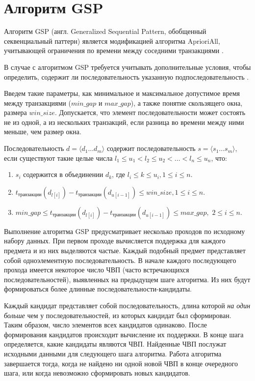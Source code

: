 \section{Алгоритм GSP}
Алгоритм GSP (англ. Generalized Sequential Pattern, обобщенный секвенциальный паттерн) является модификацией алгоритма AprioriAll, учитывающей ограничения по времени между соседними транзакциями \cite{1_, 32_}.

В случае с алгоритмом GSP требуется учитывать дополнительные условия, чтобы определить, содержит ли последовательность указанную подпоследовательность \cite{gsp}.

Введем такие параметры, как минимальное и максимальное допустимое время между транзакциями ($min\_gap$ и $max\_gap$), а также понятие скользящего окна, размера $win\_size$. Допускается, что элемент последовательности может состоять не из одной, а из нескольких транзакций, если разница во времени между ними меньше, чем размер окна.

Последовательность $d = \langle d_1...d_m \rangle$ содержит последовательность
$s = \langle s_1...s_m \rangle$, если существуют такие целые числа $l_1 ≤ u_1 < l_2 ≤ u_2 < ... < l_n ≤ u_n$, что:

\begin{enumerate}
	\item $s_i$ содержится в объединении $d_k$, где $l_i ≤ k ≤ u_i, 1 ≤ i ≤ n$.
	\item $t_{\text{транзакции}}(d_{l[i]}) - t_{\text{транзакции}} (d_{u[i-1]}) ≤ win\_size, 1 ≤ i ≤ n.$
	\item $min\_gap ≤ t_{\text{транзакции}}(d_{l[i]}) - t_{\text{транзакции}}(d_{u[i-1]}) ≤ max\_gap,$ \newline $2≤i≤n.$
\end{enumerate}

Выполнение алгоритма GSP предусматривает несколько проходов по исходному набору данных. При первом проходе вычисляется поддержка для каждого предмета и из них выделяются частые. Каждый подобный предмет представляет собой одноэлементную последовательность. В начале каждого последующего прохода имеется некоторое число ЧВП (часто встречающихся последовательностей), выявленных на предыдущем шаге алгоритма. Из них будут формироваться более длинные последовательности-кандидаты.

Каждый кандидат представляет собой последовательность, длина которой \textit{на один больше} чем у последовательностей, из которых кандидат был сформирован. Таким образом, число элементов всех кандидатов одинаково. После формирования кандидатов происходит вычисление их поддержки. В конце шага определяется, какие кандидаты являются ЧВП. Найденные ЧВП послужат исходными данными для следующего шага алгоритма. Работа алгоритма завершается тогда, когда не найдено ни одной новой ЧВП в конце очередного шага, или когда невозможно сформировать новых кандидатов.

